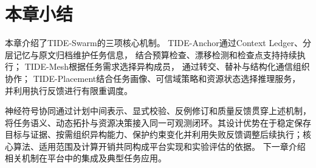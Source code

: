 \section{本章小结}

本章介绍了TIDE-Swarm的三项核心机制。
TIDE-Anchor通过Context Ledger、分层记忆与原文归档维护任务信息，
结合预算检查、漂移检测和检查点支持持续执行；
TIDE-Mesh根据任务需求选择异构成员，
通过转交、替补与结构化通信组织协作；
TIDE-Placement结合任务画像、可信域策略和资源状态选择推理服务，
并利用执行反馈进行有限重调度。

神经符号协同通过计划中间表示、显式校验、反例修订和质量反馈贯穿上述机制，将任务语义、动态拓扑与资源决策接入同一可观测闭环。其设计优势在于稳定保存目标与证据、按需组织异构能力、保护约束变化并利用失败反馈调整后续执行；核心算法、适用范围及计算开销共同构成平台实现和实验评估的依据。
下一章介绍相关机制在平台中的集成及典型任务应用。


